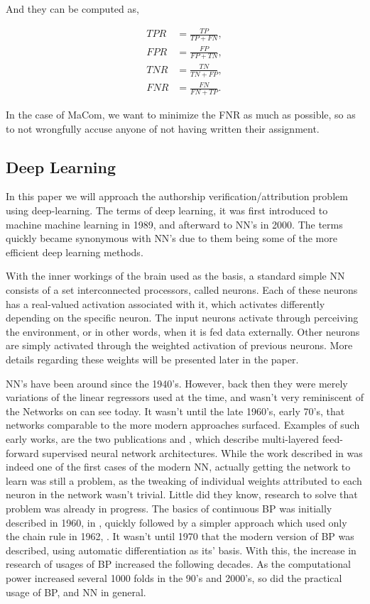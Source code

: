 And they can be computed as,

\begin{align}
    TPR &= \frac{TP}{TP + FN}, \\
    FPR &= \frac{FP}{FP + TN}, \\
    TNR &= \frac{TN}{TN + FP}, \\
    FNR &= \frac{FN}{FN + TP}.
\end{align}

In the case of MaCom, we want to minimize the \gls{FNR} as much as possible, so
as to not wrongfully accuse anyone of not having written their assignment.


\subsection{Deep Learning}

In this paper we will approach the authorship verification/attribution problem
using deep-learning. The terms of deep learning, it was first introduced to
machine machine learning in 1989, and afterward to \gls{NN}'s in 2000. The terms
quickly became synonymous with \gls{NN}'s due to them being some of the more
efficient deep learning methods.\cite{Schmidhuber:2015}

With the inner workings of the brain used as the basis, a standard simple
\gls{NN} consists of a set interconnected processors, called neurons. Each of
these neurons has a real-valued activation associated with it, which activates
differently depending on the specific neuron. The input neurons activate through
perceiving the environment, or in other words, when it is fed data externally.
Other neurons are simply activated through the weighted activation of previous
neurons. More details regarding these weights will be presented later in the
paper.\cite{DBLP:journals/corr/Schmidhuber14}

\gls{NN}'s have been around since the 1940's. However, back then they were
merely variations of the linear regressors used at the time, and wasn't
very reminiscent of the Networks on can see today. It wasn't until the
late 1960's, early 70's, that networks comparable to the more modern
approaches surfaced. Examples of such early works, are the two publications
\cite{ivakhnenko1973cybernetic} and \cite{4308320}, which describe multi-layered
feed-forward supervised neural network architectures. While the work described
in \cite{4308320} was indeed one of the first cases of the modern \gls{NN},
actually getting the network to learn was still a problem, as the tweaking of
individual weights attributed to each neuron in the network wasn't trivial.
Little did they know, research to solve that problem was already in progress.
The basics of continuous \gls{BP} was initially described in 1960, in
\cite{Kelley1960}, quickly followed by a simpler approach which used only the
chain rule in 1962, \cite{DREYFUS196230}. It wasn't until 1970 that the modern
version of \gls{BP} was described, using automatic differentiation as its'
basis. With this, the increase in research of usages of \gls{BP} increased the
following decades. As the computational power increased several 1000 folds in
the 90's and 2000's, so did the practical usage of \gls{BP}, and \gls{NN} in
general.\cite{Schmidhuber:2015}

